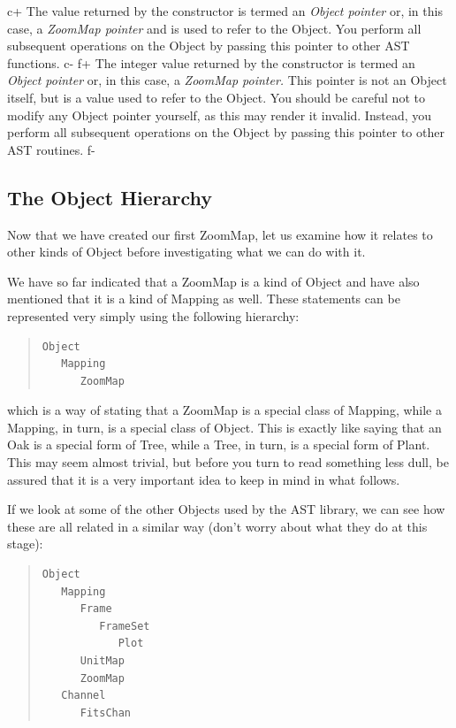 \documentclass[twoside,11pt]{article}
\begin{document}
c+
The value returned by the constructor is termed an {\em{Object pointer}}
or, in this case, a {\em{ZoomMap pointer}} and is used to refer to the
Object.  You perform all subsequent operations on the Object by
passing this pointer to other AST functions.
c-
f+
The integer value returned by the constructor is termed an {\em{Object
pointer}} or, in this case, a {\em{ZoomMap pointer.}} This pointer is not
an Object itself, but is a value used to refer to the Object. You
should be careful not to modify any Object pointer yourself, as this
may render it invalid. Instead, you perform all subsequent operations
on the Object by passing this pointer to other AST routines.
f-

\subsection{\label{ss:objecthierarchy}The Object Hierarchy}

Now that we have created our first ZoomMap, let us examine how it
relates to other kinds of Object before investigating what we can do
with it.

We have so far indicated that a ZoomMap is a kind of Object and have
also mentioned that it is a kind of Mapping as well. These statements
can be represented very simply using the following hierarchy:

\begin{quote}
\small
\begin{verbatim}
Object
   Mapping
      ZoomMap
\end{verbatim}
\normalsize
\end{quote}

which is a way of stating that a ZoomMap is a special class of
Mapping, while a Mapping, in turn, is a special class of Object.  This
is exactly like saying that an Oak is a special form of Tree, while a
Tree, in turn, is a special form of Plant. This may seem almost
trivial, but before you turn to read something less dull, be assured
that it is a very important idea to keep in mind in what follows.

If we look at some of the other Objects used by the AST library, we
can see how these are all related in a similar way (don't worry about
what they do at this stage):
\label{ss:mappinghierarchy}

\begin{quote}
\small
\begin{verbatim}
Object
   Mapping
      Frame
         FrameSet
            Plot
      UnitMap
      ZoomMap
   Channel
      FitsChan
\end{verbatim}
\normalsize
\end{quote}
\end{document}
